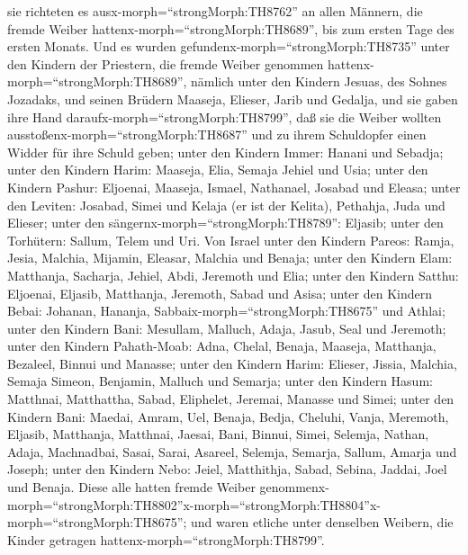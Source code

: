 sie richteten es ausx-morph=``strongMorph:TH8762'' an allen Männern, die
fremde Weiber hattenx-morph=``strongMorph:TH8689'', bis zum ersten Tage
des ersten Monats.  Und es wurden
gefundenx-morph=``strongMorph:TH8735'' unter den Kindern der Priestern,
die fremde Weiber genommen hattenx-morph=``strongMorph:TH8689'', nämlich
unter den Kindern Jesuas, des Sohnes Jozadaks, und seinen Brüdern
Maaseja, Elieser, Jarib und Gedalja,  und sie gaben ihre
Hand daraufx-morph=``strongMorph:TH8799'', daß sie die Weiber wollten
ausstoßenx-morph=``strongMorph:TH8687'' und zu ihrem Schuldopfer einen
Widder für ihre Schuld geben;  unter den Kindern Immer:
Hanani und Sebadja;  unter den Kindern Harim: Maaseja,
Elia, Semaja Jehiel und Usia;  unter den Kindern Pashur:
Eljoenai, Maaseja, Ismael, Nathanael, Josabad und Eleasa; 
unter den Leviten: Josabad, Simei und Kelaja (er ist der Kelita),
Pethahja, Juda und Elieser;  unter den
sängernx-morph=``strongMorph:TH8789'': Eljasib; unter den Torhütern:
Sallum, Telem und Uri.  Von Israel unter den Kindern
Pareos: Ramja, Jesia, Malchia, Mijamin, Eleasar, Malchia und Benaja;
 unter den Kindern Elam: Matthanja, Sacharja, Jehiel, Abdi,
Jeremoth und Elia;  unter den Kindern Satthu: Eljoenai,
Eljasib, Matthanja, Jeremoth, Sabad und Asisa;  unter den
Kindern Bebai: Johanan, Hananja, Sabbaix-morph=``strongMorph:TH8675''
und Athlai;  unter den Kindern Bani: Mesullam, Malluch,
Adaja, Jasub, Seal und Jeremoth;  unter den Kindern
Pahath-Moab: Adna, Chelal, Benaja, Maaseja, Matthanja, Bezaleel, Binnui
und Manasse;  unter den Kindern Harim: Elieser, Jissia,
Malchia, Semaja Simeon,  Benjamin, Malluch und Semarja;
 unter den Kindern Hasum: Matthnai, Matthattha, Sabad,
Eliphelet, Jeremai, Manasse und Simei;  unter den Kindern
Bani: Maedai, Amram, Uel,  Benaja, Bedja, Cheluhi,
 Vanja, Meremoth, Eljasib,  Matthanja,
Matthnai, Jaesai,  Bani, Binnui, Simei, 
Selemja, Nathan, Adaja,  Machnadbai, Sasai, Sarai,
 Asareel, Selemja, Semarja,  Sallum, Amarja
und Joseph;  unter den Kindern Nebo: Jeiel, Matthithja,
Sabad, Sebina, Jaddai, Joel und Benaja.  Diese alle hatten
fremde Weiber
genommenx-morph=``strongMorph:TH8802''x-morph=``strongMorph:TH8804''\textbar x-morph=``strongMorph:TH8675'';
und waren etliche unter denselben Weibern, die Kinder getragen
hattenx-morph=``strongMorph:TH8799''.

